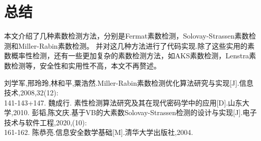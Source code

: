 \documentclass[a4paper]{article}
\begin{document}
\section{总结}
本文介绍了几种素数检测方法，分别是Fermat素数检测，Solovay-Strassen素数检测和Miller-Rabin素数检测。
并对这几种方法进行了代码实现.除了这些实用的素数概率性检测，还有一些更加复杂的素数检测方法，如AKS素数检测，Lenstra素数检测等，安全性和实用性不高，本文不再赘述。
\begin{thebibliography}{1000}  
    
    刘学军,邢玲玲,林和平,粟浩然.Miller-Rabin素数检测优化算法研究与实现[J].信息技术,2008,32(12):
    \\141-143+147.
    魏成行. 素性检测算法研究及其在现代密码学中的应用[D].山东大学,2010.
    彭韬,陈文庆.基于VB的大素数Solovay-Strassen检测的设计与实现[J].电子技术与软件工程,2020,(10):
    \\161-162.
    陈恭亮.信息安全数学基础[M].清华大学出版社,2004.
\end{thebibliography}
\end{document}
